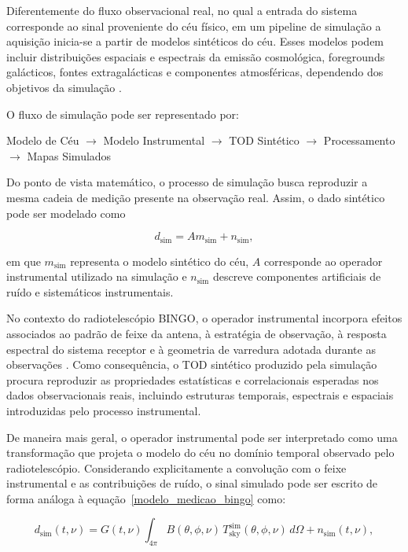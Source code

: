 Diferentemente do fluxo observacional real, no qual a entrada do sistema corresponde ao sinal proveniente do céu físico, em um pipeline de simulação a aquisição inicia-se a partir de modelos sintéticos do céu. Esses modelos podem incluir distribuições espaciais e espectrais da emissão cosmológica, foregrounds galácticos, fontes extragalácticas e componentes atmosféricas, dependendo dos objetivos da simulação \cite{mericia2019hi}.

O fluxo de simulação pode ser representado por:

\begin{center}
Modelo de Céu
\(\rightarrow\)
Modelo Instrumental
\(\rightarrow\)
TOD Sintético
\(\rightarrow\)
Processamento
\(\rightarrow\)
Mapas Simulados
\end{center}

Do ponto de vista matemático, o processo de simulação busca reproduzir a mesma cadeia de medição presente na observação real. Assim, o dado sintético pode ser modelado como

\begin{equation}
d_{\mathrm{sim}} = A m_{\mathrm{sim}} + n_{\mathrm{sim}},
\label{eq:modelo_sim}
\end{equation}

em que \(m_{\mathrm{sim}}\) representa o modelo sintético do céu, \(A\) corresponde ao operador instrumental utilizado na simulação e \(n_{\mathrm{sim}}\) descreve componentes artificiais de ruído e sistemáticos instrumentais.

No contexto do radiotelescópio BINGO, o operador instrumental incorpora efeitos associados ao padrão de feixe da antena, à estratégia de observação, à resposta espectral do sistema receptor e à geometria de varredura adotada durante as observações \cite{mericia2019hi}. Como consequência, o TOD sintético produzido pela simulação procura reproduzir as propriedades estatísticas e correlacionais esperadas nos dados observacionais reais, incluindo estruturas temporais, espectrais e espaciais introduzidas pelo processo instrumental.

De maneira mais geral, o operador instrumental pode ser interpretado como uma transformação que projeta o modelo do céu no domínio temporal observado pelo radiotelescópio. Considerando explicitamente a convolução com o feixe instrumental e as contribuições de ruído, o sinal simulado pode ser escrito de forma análoga à equação~\eqref{modelo_medicao_bingo} como:

\begin{equation}
d_{\mathrm{sim}}(t,\nu)
=
G(t,\nu)
\int_{4\pi}
B(\theta,\phi,\nu)\,
T_{\mathrm{sky}}^{\mathrm{sim}}(\theta,\phi,\nu)\,
d\Omega
+
n_{\mathrm{sim}}(t,\nu),
\label{eq:tod_simulado}
\end{equation}

